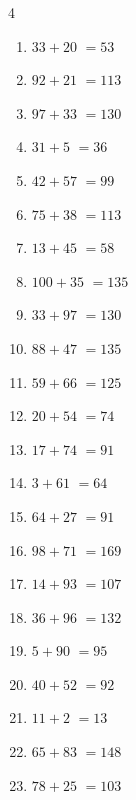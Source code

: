 \begin{multicols}{4}
\begin{enumerate}
  \item $33+20$
        $=53$

  \item $92+21$
        $=113$

  \item $97+33$
        $=130$

  \item $31+5$
        $=36$

  \item $42+57$
        $=99$

\columnbreak %

  \item $75+38$
        $=113$

  \item $13+45$
        $=58$

  \item $100+35$
        $=135$

  \item $33+97$
        $=130$

  \item $88+47$
        $=135$

  \item $59+66$
        $=125$

  \item $20+54$
        $=74$

  \item $17+74$
        $=91$

  \item $3+61$
        $=64$

  \item $64+27$
        $=91$

  \item $98+71$
        $=169$

  \item $14+93$
        $=107$

  \item $36+96$
        $=132$

  \item $5+90$
        $=95$

  \item $40+52$
        $=92$

  \item $11+2$
        $=13$

  \item $65+83$
        $=148$

  \item $78+25$
        $=103$


\end{enumerate}
\end{multicols}
